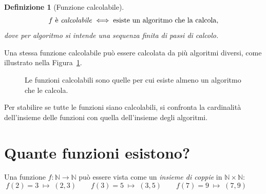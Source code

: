 \documentclass[a4paper, 11pt, oneside]{book}
\theoremstyle{formale}
\newtheorem*{definition}{Definizione}
\begin{document}
    \begin{definition}[Funzione calcolabile]
        \begin{equation*}
            f \text{ \`e \emph{calcolabile}} \iff \text{esiste un algoritmo che la calcola},
        \end{equation*}
        dove per \emph{algoritmo} si intende una sequenza finita di passi di calcolo.
    \end{definition}
    Una stessa funzione calcolabile pu\`o essere calcolata da pi\`u algoritmi diversi, come
    illustrato nella Figura~\ref{fig:calcolabili}.

    \begin{figure}[H]
        \centering
        \caption{Le funzioni calcolabili sono quelle per cui esiste almeno un algoritmo che
            le calcola.}
        \label{fig:calcolabili}
    \end{figure}

    Per stabilire se tutte le funzioni siano calcolabili, si confronta la cardinalit\`a
    dell'insieme delle funzioni con quella dell'insieme degli algoritmi.

    \section{Quante funzioni esistono?}
    \label{sec:quante-funzioni}
    Una funzione $f \colon \mathbb{N} \to \mathbb{N}$ pu\`o essere vista come un \emph{insieme
    di coppie} in $\mathbb{N} \times \mathbb{N}$:
    \begin{equation*}
        f(2) = 3 \;\mapsto\; (2, 3) \qquad
        f(3) = 5 \;\mapsto\; (3, 5) \qquad
        f(7) = 9 \;\mapsto\; (7, 9) \qquad
    \end{equation*}
\end{document}
